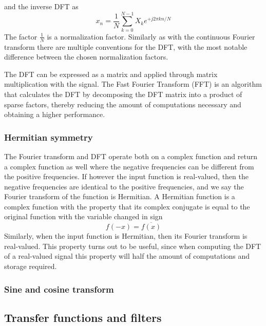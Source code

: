 and the inverse DFT as
\begin{equation}
 x_n = \frac{1}{N} \sum_{k=0}^{N-1} X_k e^{+j 2 \pi k n/N}
\end{equation}
The factor $\frac{1}{N}$ is a normalization factor. Similarly as with the
continuous Fourier transform there are multiple conventions for the DFT, with
the most notable difference between the chosen normalization factors.

The DFT can be expressed as a matrix and applied through matrix multiplication
with the signal. The Fast Fourier Transform (FFT) is an algorithm that
calculates the DFT by decomposing the DFT matrix into a product of sparse
factors, thereby reducing the amount of computations necessary and obtaining a
higher performance.


\subsubsection{Hermitian symmetry}
The Fourier transform and DFT operate both on a complex function and return a
complex function as well where the negative frequencies can be different from
the positive frequencies. If however the input function is real-valued, then the
negative frequencies are identical to the positive frequencies, and we say the
Fourier transform of the function is Hermitian. A Hermitian function is a
complex function with the property that its complex conjugate is equal to the
original function with the variable changed in sign
\begin{equation}
 f(-x) = \overline{f(x)}
\end{equation}
Similarly, when the input function is Hermitian, then its Fourier transform is
real-valued. This property turns out to be useful, since when computing the DFT
of a real-valued signal this property will half the amount of computations and
storage required.

\subsubsection{Sine and cosine transform}



\subsection{Transfer functions and filters}

